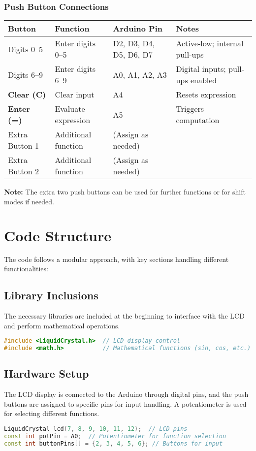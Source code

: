 \documentclass[journal,12pt,onecolumn,article]{IEEEtran}
\theoremstyle{remark}
\begin{document}
\subsubsection{Push Button Connections}
\centering
\begin{tabular}{|l|l|l|l|}
\hline
\textbf{Button}  & \textbf{Function}         & \textbf{Arduino Pin} & \textbf{Notes} \\ \hline
Digits 0--5    & Enter digits 0--5         & D2, D3, D4, D5, D6, D7   & Active-low; internal pull-ups \\ \hline
Digits 6--9    & Enter digits 6--9         & A0, A1, A2, A3           & Digital inputs; pull-ups enabled \\ \hline
\textbf{Clear (C)}    & Clear input                & A4                      & Resets expression \\ \hline
\textbf{Enter (=)}   & Evaluate expression        & A5                      & Triggers computation \\ \hline
Extra Button 1 & Additional function       & (Assign as needed)      & \\ \hline
Extra Button 2 & Additional function       & (Assign as needed)      & \\ \hline
\end{tabular}

\bigskip
\textbf{Note:} The extra two push buttons can be used for further functions or for shift modes if needed.

\section{Code Structure}
The code follows a modular approach, with key sections handling different functionalities:

\subsection{Library Inclusions}
The necessary libraries are included at the beginning to interface with the LCD and perform mathematical operations.
\begin{lstlisting}[language=C++, caption=Library Inclusion]
#include <LiquidCrystal.h>  // LCD display control
#include <math.h>           // Mathematical functions (sin, cos, etc.)
\end{lstlisting}

\subsection{Hardware Setup}
The LCD display is connected to the Arduino through digital pins, and the push buttons are assigned to specific pins for input handling. A potentiometer is used for selecting different functions.
\begin{lstlisting}[language=C++, caption=Hardware Setup]
LiquidCrystal lcd(7, 8, 9, 10, 11, 12);  // LCD pins
const int potPin = A0;  // Potentiometer for function selection
const int buttonPins[] = {2, 3, 4, 5, 6}; // Buttons for input
\end{lstlisting}
\end{document}
